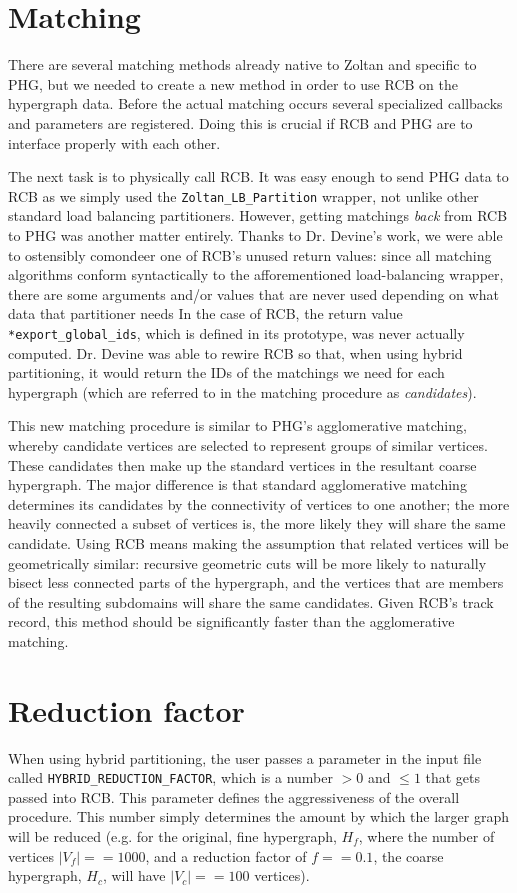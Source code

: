 \documentclass[12pt]{article}
\begin{document}
\section{Matching}
There are several matching methods already native to Zoltan and specific to
PHG, but we needed to create a new method in order to use RCB on the
hypergraph data. Before the actual matching occurs several specialized
callbacks and parameters are registered. Doing this is crucial if RCB and PHG
are to interface properly with each other.

The next task is to physically call RCB. It was easy enough to send PHG
data to RCB as we simply used the \texttt{Zoltan\_LB\_Partition} wrapper,
not unlike other standard load balancing partitioners. However, getting
matchings \emph{back} from RCB to PHG was another matter entirely. Thanks to
Dr. Devine's work, we were able to ostensibly comondeer one of RCB's unused
return values: since all matching algorithms conform syntactically to the
afforementioned load-balancing wrapper, there are some arguments and/or
values that are never used depending on what data that partitioner needs In
the case of RCB, the return value \texttt{*export\_global\_ids}, which is
defined in its prototype, was never actually computed. Dr. Devine was able
to rewire RCB so that, when using hybrid partitioning, it would return the
IDs of the matchings we need for each hypergraph (which are referred to in
the matching procedure as \emph{candidates}).

This new matching procedure is similar to PHG's agglomerative matching,
whereby candidate vertices are selected to represent groups of similar
vertices. These candidates then make up the standard vertices in the
resultant coarse hypergraph. The major difference is that standard
agglomerative matching determines its candidates by the connectivity of
vertices to one another; the more heavily connected a subset of vertices
is, the more likely they will share the same candidate. Using RCB means
making the assumption that related vertices will be geometrically similar:
recursive geometric cuts will be more likely to naturally bisect less
connected parts of the hypergraph, and the vertices that are members of
the resulting subdomains will share the same candidates. Given RCB's
track record, this method should be significantly faster than the
agglomerative matching.


\section{Reduction factor}
When using hybrid partitioning, the user passes a parameter in the input
file called \texttt{HYBRID\_REDUCTION\_FACTOR}, which is a number $> 0$
and $\leq 1$ that gets passed into RCB. This parameter defines the
aggressiveness of the overall procedure. This number simply determines
the amount by which the larger graph will be reduced (e.g. for the
original, fine hypergraph, $H_f$, where the number of vertices
$|V_f| == 1000$, and a reduction factor of $f == 0.1$, the coarse hypergraph,
$H_c$, will have $|V_c| == 100$ vertices).
\end{document}
